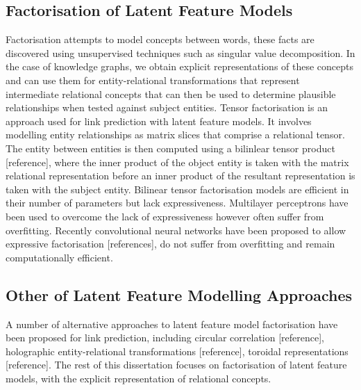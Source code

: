 \subsection{Factorisation of Latent Feature Models}
Factorisation attempts to model concepts between words, these facts are discovered using unsupervised techniques such as singular value decomposition. In the case of knowledge graphs, we obtain explicit representations of these concepts and can use them for entity-relational transformations that represent intermediate relational concepts that can then be used to determine plausible relationships when tested against subject entities.
Tensor factorisation is an approach used for link prediction with latent feature models. It involves modelling entity relationships as matrix slices that comprise a relational tensor. The entity between entities is then computed using a bilinlear tensor product [reference], where the inner product of the object entity is taken with the matrix relational representation before an inner product of the resultant representation is taken with the subject entity. Bilinear tensor factorisation models are efficient in their number of parameters but lack expressiveness. Multilayer perceptrons have been used to overcome the lack of expressiveness however often suffer from overfitting. Recently convolutional neural networks have been proposed to allow expressive factorisation [references], do not suffer from overfitting and remain computationally efficient. \newline
\subsection{Other of Latent Feature Modelling Approaches}
A number of alternative approaches to latent feature model factorisation have been proposed for link prediction, including circular correlation [reference], holographic entity-relational transformations [reference], toroidal representations [reference]. The rest of this dissertation focuses on factorisation of latent feature models, with the explicit representation of relational concepts. \newline

